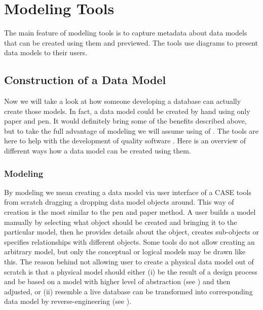 \chapter{Modeling Tools}
\label{modeling_tools}

The main feature of modeling tools is to capture metadata about data models that can be created using them and previewed. The tools use diagrams to present data models to their users.

\section{Construction of a Data Model}

Now we will take a look at how someone developing a database can actually create those models.
In fact, a data model could be created by hand using only paper and pen. It would definitely bring some of the benefits described above, but to take the full advantage of modeling we will assume using of . The tools are here to help with the development of quality software \cite{CASETools}. 
Here is an overview of different ways how a data model can be created using them.

\subsection{Modeling}

By modeling we mean creating a data model via user interface of a CASE tools from scratch dragging a dropping data model objects around. 
This way of creation is the most similar to the pen and paper method. A user builds a model manually by selecting what object should be created and bringing it to the particular model, then he provides details about the object, creates sub-objects or specifies relationships with different objects.
Some tools do not allow creating an arbitrary model, but only the conceptual or logical models may be drawn like this. 
The reason behind not allowing user to create a physical data model out of scratch is that a physical model should either (i) be the result of a design process and be based on a model with higher level of abstraction (see ) and then adjusted, or (ii) resemble a live database can be transformed into corresponding data model by reverse-engineering (see ).

